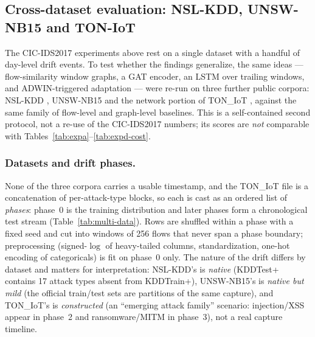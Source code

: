\documentclass[twocolumn]{llncs}
\begin{document}
\subsection{Cross-dataset evaluation: NSL-KDD, UNSW-NB15 and TON-IoT}
\label{sec:multi}

The CIC-IDS2017 experiments above rest on a single dataset with a handful of day-level drift
events. To test whether the findings generalize, the same ideas --- flow-similarity window graphs,
a GAT encoder, an LSTM over trailing windows, and ADWIN-triggered adaptation --- were re-run on
three further public corpora: NSL-KDD \cite{tavallaee2009nslkdd}, UNSW-NB15
\cite{moustafa2015unsw} and the network portion of TON\_IoT \cite{alsaedi2020toniot}, against the
same family of flow-level and graph-level baselines. This is a self-contained second protocol, not
a re-use of the CIC-IDS2017 numbers; its scores are \emph{not} comparable with
Tables~\ref{tab:expa}--\ref{tab:expd-cost}.

\subsubsection{Datasets and drift phases.} None of the three corpora carries a usable timestamp,
and the TON\_IoT file is a concatenation of per-attack-type blocks, so each is cast as an ordered
list of \emph{phases}: phase~0 is the training distribution and later phases form a chronological
test stream (Table~\ref{tab:multi-data}). Rows are shuffled within a phase with a fixed seed and cut
into windows of 256 flows that never span a phase boundary; preprocessing (signed-$\log$ of
heavy-tailed columns, standardization, one-hot encoding of categoricals) is fit on phase~0 only.
The nature of the drift differs by dataset and matters for interpretation: NSL-KDD's is
\emph{native} (KDDTest+ contains 17 attack types absent from KDDTrain+), UNSW-NB15's is
\emph{native but mild} (the official train/test sets are partitions of the same capture), and
TON\_IoT's is \emph{constructed} (an ``emerging attack family'' scenario: injection/XSS appear in
phase~2 and ransomware/MITM in phase~3), not a real capture timeline.
\end{document}
